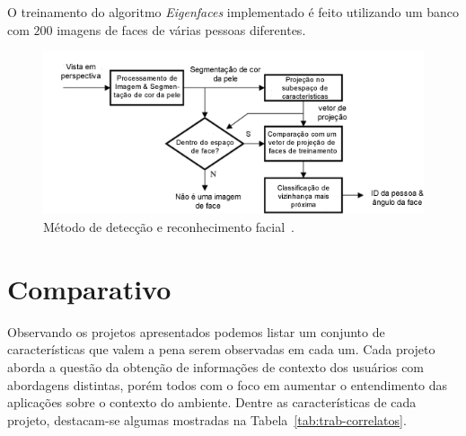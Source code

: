 O treinamento do algoritmo \textit{Eigenfaces} implementado é feito utilizando um banco com $\displaystyle 200$ imagens de faces de várias pessoas diferentes.

	\begin{figure}[hbt]
		\begin{center}
			\includegraphics[scale=0.8]{figuras/3.TrabalhosCorrelatos/facerec.png}
		\end{center}
		\caption{Método de detecção e reconhecimento facial~\cite{trivedi}.}
		\label{facerec}
	\end{figure}

\section{Comparativo}

Observando os projetos apresentados podemos listar um conjunto de características que valem a pena serem observadas em cada um. Cada projeto aborda a questão da obtenção de informações de contexto dos usuários com abordagens distintas, porém todos com o foco em aumentar o entendimento das aplicações sobre o contexto do ambiente. Dentre as características de cada projeto, destacam-se algumas mostradas na Tabela~\ref{tab:trab-correlatos}.

